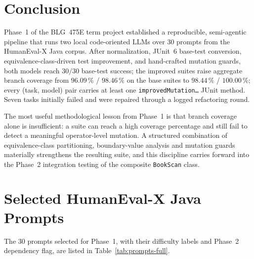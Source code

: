 \documentclass[journal]{IEEEtran}
\begin{document}
\section{Conclusion}\label{sec:conclusion}

Phase~1 of the BLG~475E term project established a reproducible,
semi-agentic pipeline that runs two local code-oriented LLMs over 30
prompts from the HumanEval-X Java corpus. After normalization, JUnit~6
base-test conversion, equivalence-class-driven test improvement, and
hand-crafted mutation guards, both models reach $30/30$ base-test
success; the improved suites raise aggregate branch coverage from
$96.09\,\%$ / $98.46\,\%$ on the base suites to $98.44\,\%$ / $100.00\,\%$;
every (task, model) pair carries at least one \texttt{improvedMutation\ldots}
JUnit method. Seven tasks initially failed and were repaired through a
logged refactoring round.

The most useful methodological lesson from Phase~1 is that branch coverage
alone is insufficient: a suite can reach a high coverage percentage and
still fail to detect a meaningful operator-level mutation. A structured
combination of equivalence-class partitioning, boundary-value analysis and
mutation guards materially strengthens the resulting suite, and this
discipline carries forward into the Phase~2 integration testing of the
composite \texttt{BookScan} class.

\appendices
\section{Selected HumanEval-X Java Prompts}\label{app:prompts}

The 30 prompts selected for Phase~1, with their difficulty labels and
Phase~2 dependency flag, are listed in Table~\ref{tab:prompts-full}.
\end{document}
